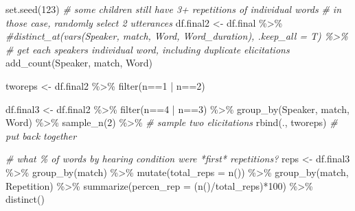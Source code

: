 \documentclass[
]{article}
\newenvironment{Shaded}{\begin{snugshade}}{\end{snugshade}}
\newcommand{\AttributeTok}[1]{\textcolor[rgb]{0.77,0.63,0.00}{#1}}
\newcommand{\CommentTok}[1]{\textcolor[rgb]{0.56,0.35,0.01}{\textit{#1}}}
\newcommand{\DecValTok}[1]{\textcolor[rgb]{0.00,0.00,0.81}{#1}}
\newcommand{\FunctionTok}[1]{\textcolor[rgb]{0.00,0.00,0.00}{#1}}
\newcommand{\NormalTok}[1]{#1}
\newcommand{\OtherTok}[1]{\textcolor[rgb]{0.56,0.35,0.01}{#1}}
\newcommand{\SpecialCharTok}[1]{\textcolor[rgb]{0.00,0.00,0.00}{#1}}
\newcommand{\StringTok}[1]{\textcolor[rgb]{0.31,0.60,0.02}{#1}}
\begin{document}
\begin{Shaded}
\begin{Highlighting}[]
\FunctionTok{set.seed}\NormalTok{(}\DecValTok{123}\NormalTok{)}
\CommentTok{\# some children still have 3+ repetitions of individual words}
\CommentTok{\# in those case, randomly select 2 utterances}
\NormalTok{df.final2 }\OtherTok{\textless{}{-}}\NormalTok{ df.final }\SpecialCharTok{\%\textgreater{}\%}
  \CommentTok{\#distinct\_at(vars(Speaker, match, Word, Word\_duration), .keep\_all = T) \%\textgreater{}\% \# get each speaker\textquotesingle{}s individual word, including duplicate elicitations}
  \FunctionTok{add\_count}\NormalTok{(Speaker, match, Word) }

\NormalTok{tworeps }\OtherTok{\textless{}{-}}\NormalTok{ df.final2 }\SpecialCharTok{\%\textgreater{}\%} \FunctionTok{filter}\NormalTok{(n}\SpecialCharTok{==}\StringTok{\textquotesingle{}1\textquotesingle{}} \SpecialCharTok{|}\NormalTok{ n}\SpecialCharTok{==}\StringTok{\textquotesingle{}2\textquotesingle{}}\NormalTok{)}

\NormalTok{df.final3 }\OtherTok{\textless{}{-}}\NormalTok{ df.final2 }\SpecialCharTok{\%\textgreater{}\%}
  \FunctionTok{filter}\NormalTok{(n}\SpecialCharTok{==}\StringTok{\textquotesingle{}4\textquotesingle{}} \SpecialCharTok{|}\NormalTok{ n}\SpecialCharTok{==}\StringTok{\textquotesingle{}3\textquotesingle{}}\NormalTok{) }\SpecialCharTok{\%\textgreater{}\%}
  \FunctionTok{group\_by}\NormalTok{(Speaker, match, Word) }\SpecialCharTok{\%\textgreater{}\%}
  \FunctionTok{sample\_n}\NormalTok{(}\DecValTok{2}\NormalTok{) }\SpecialCharTok{\%\textgreater{}\%} \CommentTok{\# sample two elicitations}
  \FunctionTok{rbind}\NormalTok{(., tworeps) }\CommentTok{\# put back together}

\CommentTok{\# what \% of words by hearing condition were *first* repetitions?}
\NormalTok{reps }\OtherTok{\textless{}{-}}\NormalTok{ df.final3 }\SpecialCharTok{\%\textgreater{}\%}
  \FunctionTok{group\_by}\NormalTok{(match) }\SpecialCharTok{\%\textgreater{}\%}
  \FunctionTok{mutate}\NormalTok{(}\AttributeTok{total\_reps =} \FunctionTok{n}\NormalTok{()) }\SpecialCharTok{\%\textgreater{}\%}
  \FunctionTok{group\_by}\NormalTok{(match, Repetition) }\SpecialCharTok{\%\textgreater{}\%}
  \FunctionTok{summarize}\NormalTok{(}\AttributeTok{percen\_rep =}\NormalTok{ (}\FunctionTok{n}\NormalTok{()}\SpecialCharTok{/}\NormalTok{total\_reps)}\SpecialCharTok{*}\DecValTok{100}\NormalTok{) }\SpecialCharTok{\%\textgreater{}\%}
  \FunctionTok{distinct}\NormalTok{()}
\end{Highlighting}
\end{Shaded}
\end{document}
